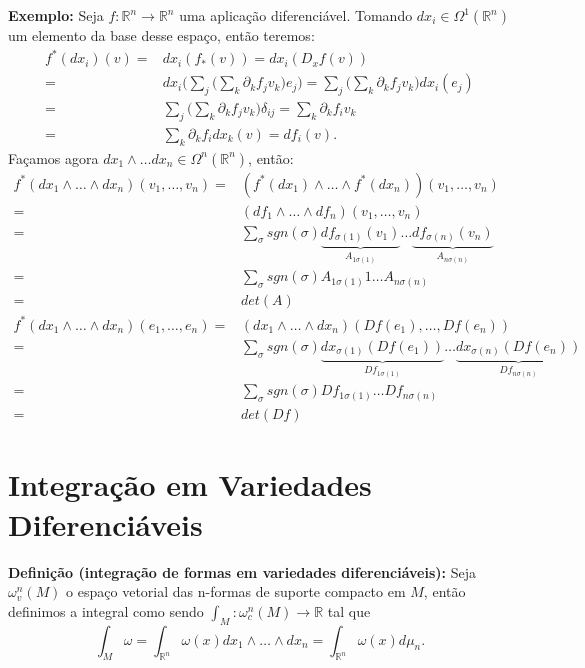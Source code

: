 \documentclass{article}
\begin{document}
	\vspace{2 mm}
	\textbf{Exemplo:} Seja $f: \mathbb{R}^{n} \to \mathbb{R}^{n}$ uma aplicação diferenciável. Tomando $dx_{i} \in \Omega^{1}(\mathbb{R}^{n})$ um elemento da base desse espaço, então teremos:
	$$
	\begin{aligned}
		f^{*}(dx_{i})(v) =& dx_{i}(f_{*}(v)) = dx_{i}(D_{x}f(v))
		\\
		=& dx_{i} \Big(\sum_{j} \Big( \sum_{k} \partial_{k} f_{j}v_{k} \Big) e_{j}\Big) = \sum_{j} \Big( \sum_{k} \partial_{k} f_{j}v_{k} \Big) dx_{i}(e_{j}) 
		\\
		=& \sum_{j} \Big( \sum_{k} \partial_{k} f_{j}v_{k} \Big) \delta_{ij}  = \sum_{k} \partial_{k} f_{i}v_{k} 
		\\
		=& \sum_{k} \partial_{k} f_{i}dx_{k}(v) = df_{i}(v). 
	\end{aligned}
	$$
	Façamos agora $dx_{1} \wedge \dots  dx_{n} \in \Omega^{n}(\mathbb{R}^{n})$, então:
	$$
	\begin{aligned}
	f^{*}(dx_{1} \wedge \dots  \wedge dx_{n})(v_{1}, \dots, v_{n}) 
	=& (f^{*}(dx_{1}) \wedge \dots  \wedge f^{*}(dx_{n})) (v_{1}, \dots, v_{n}) 
	\\
	=& (df_{1} \wedge \dots  \wedge df_{n}) (v_{1}, \dots, v_{n}) 
	\\
	 =& \sum_{\sigma} sgn(\sigma) \underbrace{df_{\sigma(1)}(v_{1})}_{A_{1\sigma(1)}} \dots \underbrace{ df_{\sigma(n)}(v_{n}) }_{A_{n\sigma(n)}}
	\\
	=& \sum_{\sigma} sgn(\sigma) A_{1\sigma(1)}1 \dots  A_{n\sigma(n)}
	\\
	=& det(A)
	\\
	f^{*}(dx_{1} \wedge \dots  \wedge dx_{n})(e_{1}, \dots, e_{n}) 
	=&  (dx_{1} \wedge \dots  \wedge dx_{n})(Df(e_{1}), \dots, Df(e_{n}))
	\\
	=& \sum_{\sigma} sgn(\sigma) \underbrace{dx_{\sigma(1)}(Df(e_{1}))}_{Df_{1\sigma(1)}} \dots \underbrace{ dx_{\sigma(n)}(Df(e_{n})) }_{Df_{n\sigma(n)}}
	\\
	=& \sum_{\sigma} sgn(\sigma) Df_{1\sigma(1)} \dots  Df_{n\sigma(n)}
	\\
	=& det(Df)
	\end{aligned}
	$$
	
	\section{Integração em Variedades Diferenciáveis}
	
	\textbf{Definição (integração de formas em variedades diferenciáveis):} Seja $\omega^{n}_{v}(M)$ o espaço vetorial das n-formas de suporte compacto em $M$, então definimos a integral como sendo $\int_{M} : \omega^{n}_{c}(M) \to \mathbb{R}$ tal que 
	$$
	\int_{M} \omega = \int_{\mathbb{R}^{n}} \omega(x)dx_{1} \wedge \dots \wedge dx_{n} = \int_{\mathbb{R}^{n}} \omega(x)d\mu_{n}.
	$$
	
\end{document}
